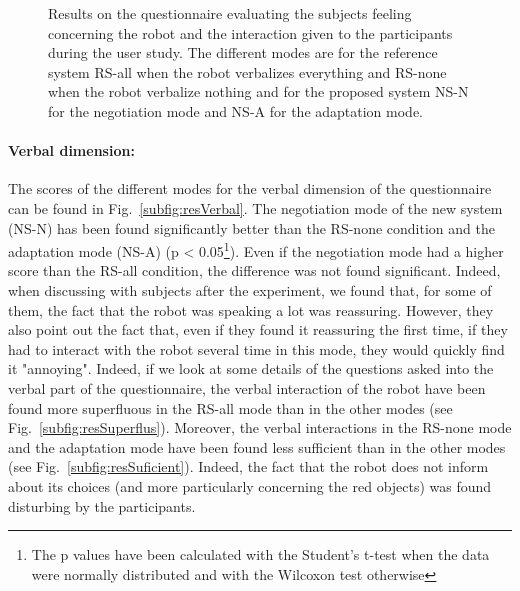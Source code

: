 \documentclass[english,a4paper,11pt,twoside]{StyleThese}
\begin{document}
\begin{figure}[!h]
{       \label{subfig:resRobot}
   }
    \caption{Results on the questionnaire evaluating the subjects feeling concerning the robot and the interaction given to the participants during the user study. The different modes are for the reference system RS-all when the robot verbalizes everything and RS-none when the robot verbalize nothing and for the proposed system NS-N for the negotiation mode and NS-A for the adaptation mode.}
    \label{fig:resUS}
\end{figure}

\paragraph{Verbal dimension:} 
The scores of the different modes for the verbal dimension of the questionnaire can be found in Fig.~\ref{subfig:resVerbal}. The negotiation mode of the new system (NS-N) has been found significantly better than the RS-none condition and the adaptation mode (NS-A) (p < 0.05\footnote{The p values have been calculated with the Student's t-test when the data were normally distributed and with the Wilcoxon test otherwise}). Even if the negotiation mode had a higher score than the RS-all condition, the difference was not found significant. Indeed, when discussing with subjects after the experiment, we found that, for some of them, the fact that the robot was speaking a lot was reassuring. However, they also point out the fact that, even if they found it reassuring the first time, if they had to interact with the robot several time in this mode, they would quickly find it "annoying". Indeed, if we look at some details of the questions asked into the verbal part of the questionnaire, the verbal interaction of the robot have been found more superfluous in the RS-all mode than in the other modes (see Fig.~\ref{subfig:resSuperflus}). Moreover, the verbal interactions in the RS-none mode and the adaptation mode have been found less sufficient than in the other modes (see Fig.~\ref{subfig:resSuficient}). Indeed, the fact that the robot does not inform about its choices (and more particularly concerning the red objects) was found disturbing by the participants. 
\end{document}
